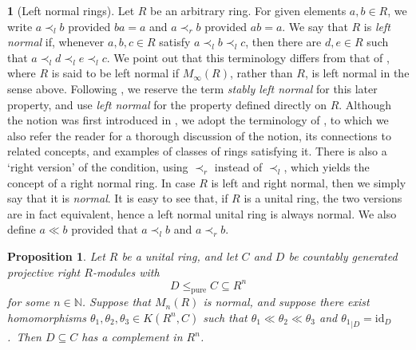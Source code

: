 \documentclass[11pt]{amsart}
\numberwithin{equation}{section}
\newtheorem{prp}[prpCt]{Proposition}
\theoremstyle{definition}
\newtheorem{pgr}[pgrCt]{}
\theoremstyle{plain}
\theoremstyle{definition}
\begin{document}
\begin{pgr}[Left normal rings]
\label{pgr:normal}
Let $R$ be an arbitrary ring. For given elements $a, b \in R$, we write $a \prec_l b$ provided $ba = a$ and $a \prec_r b$ provided $ab = a$. We say that $R$ is \emph{left normal} if, whenever $a, b, c \in R$ satisfy $a \prec_l b \prec_l c$, then there are $d, e \in R$ such that $a \prec_l d \prec_l e \prec_l c$. We point out that this terminology differs from that of \cite[7.2]{AntAraBosPerVil26}, where $R$ is said to be left normal if $M_\infty(R)$, rather than $R$, is left normal in the sense above. Following \cite{ACPQ}, we reserve the term \emph{stably left normal} for this later property, and use \emph{left normal} for the property defined directly on $R$. Although the notion was first introduced in \cite[7.2]{AntAraBosPerVil26}, we adopt the terminology of \cite{ACPQ}, to which we also refer the reader for a thorough discussion of the notion, its connections to related concepts, and examples of classes of rings satisfying it. There is also a `right version' of the condition, using $\prec_r$ instead of $\prec_l$, which yields the concept of a right normal ring. In case $R$ is left and right normal, then we simply say that it is \emph{normal}. It is easy to see that, if $R$ is a unital ring, the two versions are in fact equivalent, hence a left normal unital ring is always normal. We also define $a \ll b$ provided that $a \prec_l b$ and $a \prec_r b$.
\end{pgr}

\begin{prp} \label{prp existencia complement}
Let $R$ be a unital ring, and let $C$ and $D$ be countably generated projective right $R$-modules with $$D \leq_{\mathrm{pure}} C \subseteq R^n$$ for some $n \in \mathbb{N}$. Suppose that $M_n(R)$ is normal, and suppose there exist homomorphisms $\theta_1, \theta_2, \theta_3 \in K(R^n, C)$ such that $\theta_1 \ll \theta_2 \ll \theta_3$ and ${\theta_1}_{|D} = \mathrm{id}_D$.~Then $D \subseteq C$ has a complement in $R^n$. 
\end{prp}
\end{document}
